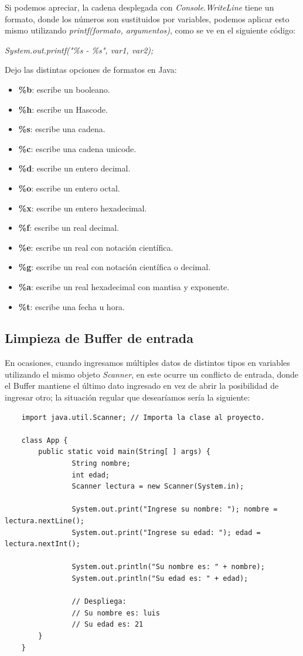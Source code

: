 Si podemos apreciar, la cadena desplegada con \textit{Console.WriteLine} tiene un formato, donde los números son sustituidos por variables, podemos aplicar esto mismo utilizando \textit{printf(formato, argumentos)}, como se ve en el siguiente código:
\begin{center}
	\textit{System.out.printf("\%s - \%s", var1, var2);}
\end{center}

Dejo las distintas opciones de formatos en Java:
\begin{itemize}
	\item \textbf{\%b}: escribe un booleano.
	\item \textbf{\%h}: escribe un Hascode.
	\item \textbf{\%s}: escribe una cadena.
	\item \textbf{\%c}: escribe una cadena unicode.
	\item \textbf{\%d}: escribe un entero decimal.
	\item \textbf{\%o}: escribe un entero octal.
	\item \textbf{\%x}: escribe un entero hexadecimal.
	\item \textbf{\%f}: escribe un real decimal.
	\item \textbf{\%e}: escribe un real con notación científica.
	\item \textbf{\%g}: escribe un real con notación científica o decimal.
	\item \textbf{\%a}: escribe un real hexadecimal con mantisa y exponente.
	\item \textbf{\%t}: escribe una fecha u hora.
\end{itemize}


\subsection{Limpieza de Buffer de entrada}
\hspace{0.55cm}En ocasiones, cuando ingresamos múltiples datos de distintos tipos en variables utilizando el mismo objeto \textit{Scanner}, en este ocurre un conflicto de entrada, donde el Buffer mantiene el último dato ingresado en vez de abrir la posibilidad de ingresar otro; la situación regular que desearíamos sería la siguiente:
\begin{lstlisting}
    import java.util.Scanner; // Importa la clase al proyecto.

    class App {
        public static void main(String[ ] args) {
        		String nombre;
        		int edad;
        		Scanner lectura = new Scanner(System.in);
        		
        		System.out.print("Ingrese su nombre: "); nombre = lectura.nextLine();
        		System.out.print("Ingrese su edad: "); edad = lectura.nextInt();
        		
        		System.out.println("Su nombre es: " + nombre);
        		System.out.println("Su edad es: " + edad);
        		
        		// Despliega:
        		// Su nombre es: luis
        		// Su edad es: 21
        }
    }
\end{lstlisting}

